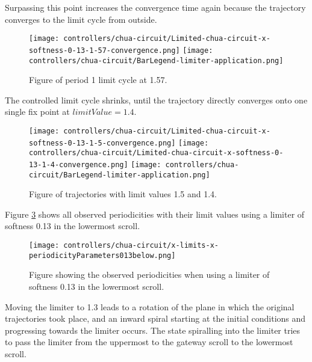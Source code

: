 \documentclass[main]{subfiles}
\begin{document}
Surpassing this point increases the convergence time again because the trajectory converges to the limit cycle from outside.

\begin{figure}[H]
\centering
\texttt{[image: controllers/chua-circuit/Limited-chua-circuit-x-softness-0-13-1-57-convergence.png]}
\texttt{[image: controllers/chua-circuit/BarLegend-limiter-application.png]}
\caption[Figure of period another 1 limit cycle using a 0.13 soft limiter.]{Figure of period 1 limit cycle at 1.57.}
\label{figure:x-0.13-fast-1-limit-cycle-trajectory-1-57}
\end{figure}

The controlled limit cycle shrinks, until the trajectory directly converges onto one single fix point at \(limitValue=1.4\). 

\begin{figure}[H]
\centering
\texttt{[image: controllers/chua-circuit/Limited-chua-circuit-x-softness-0-13-1-5-convergence.png]}
\texttt{[image: controllers/chua-circuit/Limited-chua-circuit-x-softness-0-13-1-4-convergence.png]}
\texttt{[image: controllers/chua-circuit/BarLegend-limiter-application.png]}
\caption[Figure of fix point convergence]{Figure of trajectories with limit values 1.5 and 1.4.}
\label{figure:x-0.13-convergence-trajectories}
\end{figure}

Figure \ref{figure:x-limits-x-periodicityParameters013below} shows all observed periodicities with their limit values using a limiter of softness 0.13 in the lowermost scroll. 
\begin{figure}[H]
\centering
\texttt{[image: controllers/chua-circuit/x-limits-x-periodicityParameters013below.png]}
\caption[Figure of observed periodicities in the lowermost scroll with a self-limiting 0.13 limiter]{Figure showing the observed periodicities when using a limiter of softness 0.13 in the lowermost scroll.}
\label{figure:x-limits-x-periodicityParameters013below}
\end{figure}

Moving the limiter to 1.3 leads to a rotation of the plane in which the original trajectories took place, and an inward spiral starting at the initial conditions and progressing towards the limiter occurs. %
%
The state spiralling into the limiter tries to pass the limiter from the uppermost to the gateway scroll to the lowermost scroll.
\end{document}
